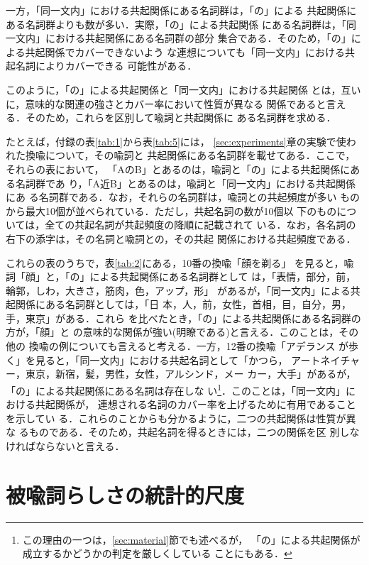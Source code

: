 一方，「同一文内」における共起関係にある名詞群は，「の」による
共起関係にある名詞群よりも数が多い．実際，「の」による共起関係
にある名詞群は，「同一文内」における共起関係にある名詞群の部分
集合である．そのため，「の」による共起関係でカバーできないよう
な連想についても「同一文内」における共起名詞によりカバーできる
可能性がある．

このように，「の」による共起関係と「同一文内」における共起関係
とは，互いに，意味的な関連の強さとカバー率において性質が異なる
関係であると言える．そのため，これらを区別して喩詞と共起関係に
ある名詞群を求める．

たとえば，付録の表\ref{tab:1}から表\ref{tab:5}には，
\ref{sec:experiments}章の実験で使われた換喩について，その喩詞と
共起関係にある名詞群を載せてある．ここで，それらの表において，
「AのB」とあるのは，喩詞と「の」による共起関係にある名詞群であ
り，「A近B」とあるのは，喩詞と「同一文内」における共起関係にあ
る名詞群である．なお，それらの名詞群は，喩詞との共起頻度が多い
ものから最大10個が並べられている．ただし，共起名詞の数が10個以
下のものについては，全ての共起名詞が共起頻度の降順に記載されて
いる．なお，各名詞の右下の添字は，その名詞と喩詞との，その共起
関係における共起頻度である．

これらの表のうちで，表\ref{tab:2}にある，10番の換喩「顔を剃る」
を見ると，喩詞「顔」と，「の」による共起関係にある名詞群として
は，「表情，部分，前，輪郭，しわ，大きさ，筋肉，色，アップ，形」
があるが，「同一文内」による共起関係にある名詞群としては，「日
本，人，前，女性，首相，目，自分，男，手，東京」がある．これら
を比べたとき，「の」による共起関係にある名詞群の方が，「顔」と
の意味的な関係が強い(明瞭である)と言える．このことは，その他の
換喩の例についても言えると考える．一方，12番の換喩「アデランス
が歩く」を見ると，「同一文内」における共起名詞として「かつら，
アートネイチャー，東京，新宿，髪，男性，女性，アルシンド，メー
カー，大手」があるが，「の」による共起関係にある名詞は存在しな
い\footnote {この理由の一つは，\ref{sec:material}節でも述べるが，
  「の」による共起関係が成立するかどうかの判定を厳しくしている
  ことにもある．}．このことは，「同一文内」における共起関係が，
連想される名詞のカバー率を上げるために有用であることを示してい
る．これらのことからも分かるように，二つの共起関係は性質が異な
るものである．そのため，共起名詞を得るときには，二つの関係を区
別しなければならないと言える．

\section{被喩詞らしさの統計的尺度}
\label{sec:measure}

